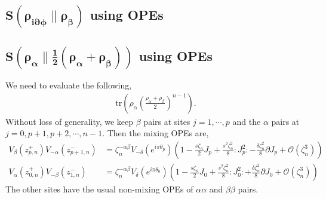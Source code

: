 \documentclass[11pt]{article}
\newcommand{\p}{\partial}
\newcommand{\mO}{\mathcal{O}}
\newcommand{\lb}{\left(}
\newcommand{\rb}{\right)}
\begin{document}
\subsection{\texorpdfstring{$\boldsymbol{S\lb\rho_{i\p \phi} \| \rho_\beta\rb }$ using OPEs}{S(rho  i del phi wrt rho0 using OPEs}}


\subsection{\texorpdfstring{$\boldsymbol{S\lb\rho_\alpha \| \frac{1}{2}\lb \rho_\alpha + \rho_\beta\rb\rb }$ using OPEs}{S(rho alpha plus half rho alpha plus half rho beta) using OPEs}}
We need to evaluate the following,
\begin{align}
    \text{tr}\lb \rho_\alpha \lb\frac{ \rho_\alpha + \rho_\beta}{2}\rb^{n-1}\rb. 
\end{align}
Without loss of generality, we keep $\beta$ pairs at sites $j = 1,\cdots, p$ and the $\alpha$ pairs at $j = 0,p+1,p+2,\cdots, n-1$. Then the mixing OPEs are,
\begin{align}
    V_\beta(z_{p,n}^+) V_{-\alpha}(z_{p+1,n}^-) &= \zeta_n^{-\alpha\beta} V_{-\delta}(e^{i\pi \theta_{p}}) \lb 1- \frac{s\zeta_n}{2}J_{p} + \frac{s^2 \zeta_n^2}{8}:J_{p}^2: - \frac{\delta\zeta_n^2}{8}\p J_{p} + \mO(\zeta_n^3)  \rb \\
    V_\alpha(z_{0,n}^+) V_{-\beta}(z_{1,n}^-) &= \zeta_n^{-\alpha\beta} V_{\delta}(e^{i\pi \theta_{0}}) \lb 1- \frac{s\zeta_n}{2}J_{0} + \frac{s^2 \zeta_n^2}{8}:J_{0}^2: + \frac{\delta\zeta_n^2}{8}\p J_{0} + \mO(\zeta_n^3)  \rb
\end{align}
The other sites have the usual non-mixing OPEs of $\alpha\alpha$ and $\beta\beta$ pairs. 
\end{document}
